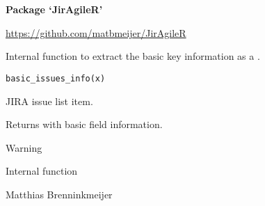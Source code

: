 \documentclass[a4paper]{book}
\begin{document}
\chapter*{}
\begin{center}
{\textbf{\huge Package `JirAgileR'}}
\par\bigskip{\large \today}
\end{center}
\begin{description}
\raggedright{}
\item[Title]
\item[Version]
\item[Description]
\item[License]
\item[URL]\AsIs{}\url{https://github.com/matbmeijer/JirAgileR}\AsIs{}
\item[Encoding]
\item[LazyData]
\item[Imports]
\item[RoxygenNote]
\end{description}
%
\begin{Description}\relax
Internal function to extract the basic key information as a .
\end{Description}
%
\begin{Usage}
\begin{verbatim}
basic_issues_info(x)
\end{verbatim}
\end{Usage}
%
\begin{Arguments}
\begin{ldescription}
\item[\code{x}] JIRA issue list item.
\end{ldescription}
\end{Arguments}
%
\begin{Value}
Returns  with basic field information.
\end{Value}
%
\begin{Section}{Warning}

Internal function
\end{Section}
%
\begin{Author}\relax
Matthias Brenninkmeijer 
\end{Author}
\end{document}
